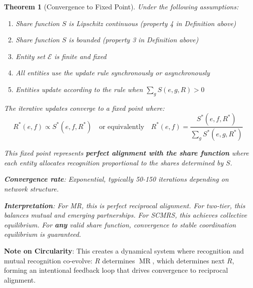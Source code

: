 \documentclass[11pt,a4paper]{article}
\newtheorem{theorem}{Theorem}[section]
\theoremstyle{definition}
\theoremstyle{remark}
\newcommand{\E}{\mathcal{E}}
\DeclareMathOperator{\MR}{MR}
\begin{document}
\begin{theorem}[Convergence to Fixed Point]
Under the following assumptions:
\begin{enumerate}
\item Share function $S$ is Lipschitz continuous (property 4 in Definition above)
\item Share function $S$ is bounded (property 3 in Definition above)
\item Entity set $\E$ is finite and fixed
\item All entities use the update rule synchronously or asynchronously
\item Entities update according to the rule when $\sum_g S(e,g,R) > 0$
\end{enumerate}

The iterative updates converge to a fixed point where:
\[ R^*(e,f) \propto S^*(e,f,R^*) \quad \text{or equivalently} \quad R^*(e,f) = \frac{S^*(e,f,R^*)}{\sum_g S^*(e,g,R^*)} \]

This fixed point represents \textbf{perfect alignment with the share function} where each entity allocates recognition proportional to the shares determined by $S$.

\textbf{Convergence rate}: Exponential, typically 50-150 iterations depending on network structure.

\textbf{Interpretation}: For MR, this is perfect reciprocal alignment. For two-tier, this balances mutual and emerging partnerships. For SCMRS, this achieves collective equilibrium. For \textbf{any} valid share function, convergence to stable coordination equilibrium is guaranteed.
\end{theorem}

\textbf{Note on Circularity}: This creates a dynamical system where recognition and mutual recognition co-evolve: $R$ determines $\MR$, which determines next $R$, forming an intentional feedback loop that drives convergence to reciprocal alignment.
\end{document}
